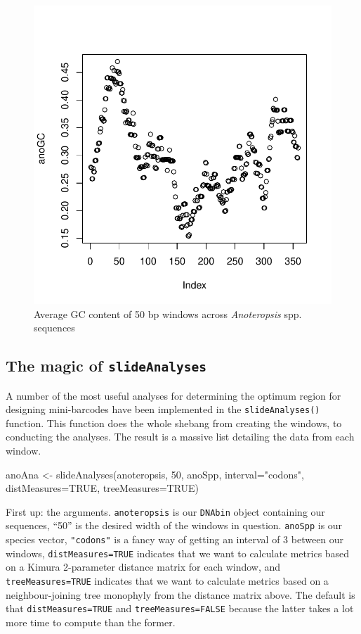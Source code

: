\documentclass{article}
\newcommand{\fun}[1]{\texttt{#1}}
\begin{document}
\begin{figure}[tbp]
	\includegraphics{slidWin}
	\caption{Average GC content of 50 bp windows across \emph{Anoteropsis} spp. sequences}
	\label{slidWin.fig}
\end{figure}

\subsection{The magic of \fun{slideAnalyses}}
A number of the most useful analyses for determining the optimum region for designing mini-barcodes \citep{Meus.etal.2008} have been implemented in the \fun{slideAnalyses()} function. This function does the whole shebang from creating the windows, to conducting the analyses. The result is a massive list detailing the data from each window. %

\begin{console}
anoAna <- slideAnalyses(anoteropsis, 50, anoSpp, interval="codons", 
distMeasures=TRUE, treeMeasures=TRUE)
\end{console}

First up: the arguments. \fun{anoteropsis} is our \fun{DNAbin} object containing our sequences, ``50'' is the desired width of the windows in question. \fun{anoSpp} is our species vector, \fun{"codons"} is a fancy way of getting an interval of 3 between our windows, \fun{distMeasures=TRUE} indicates that we want to calculate metrics based on a Kimura 2-parameter distance matrix for each window, and \fun{treeMeasures=TRUE} indicates that we want to calculate metrics based on a neighbour-joining tree monophyly from the distance matrix above. The default is that \fun{distMeasures=TRUE} and \fun{treeMeasures=FALSE} because the latter takes a lot more time to compute than the former. 
\end{document}
